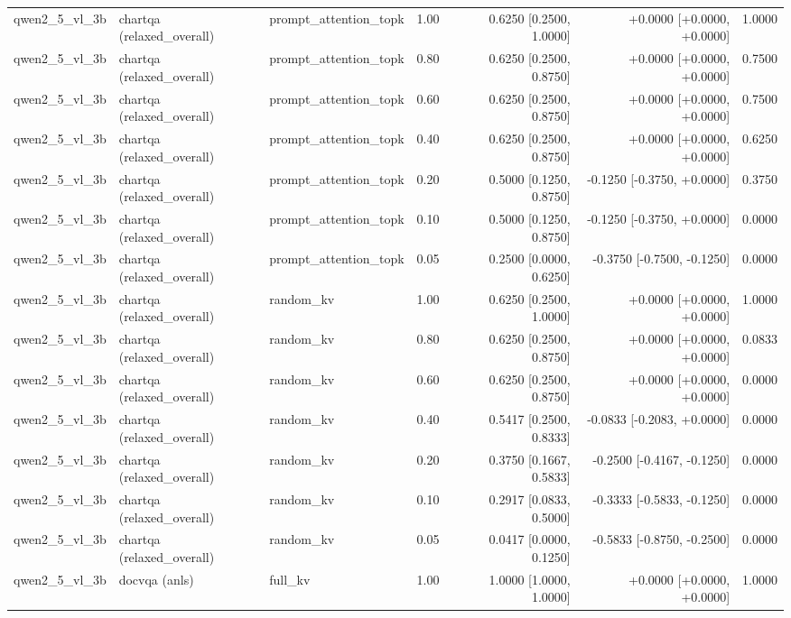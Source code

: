 \begin{longtable}{lllrrrr}
qwen2\_5\_vl\_3b & chartqa (relaxed\_overall) & prompt\_attention\_topk & 1.00 & 0.6250 [0.2500, 1.0000] & +0.0000 [+0.0000, +0.0000] & 1.0000 \\
qwen2\_5\_vl\_3b & chartqa (relaxed\_overall) & prompt\_attention\_topk & 0.80 & 0.6250 [0.2500, 0.8750] & +0.0000 [+0.0000, +0.0000] & 0.7500 \\
qwen2\_5\_vl\_3b & chartqa (relaxed\_overall) & prompt\_attention\_topk & 0.60 & 0.6250 [0.2500, 0.8750] & +0.0000 [+0.0000, +0.0000] & 0.7500 \\
qwen2\_5\_vl\_3b & chartqa (relaxed\_overall) & prompt\_attention\_topk & 0.40 & 0.6250 [0.2500, 0.8750] & +0.0000 [+0.0000, +0.0000] & 0.6250 \\
qwen2\_5\_vl\_3b & chartqa (relaxed\_overall) & prompt\_attention\_topk & 0.20 & 0.5000 [0.1250, 0.8750] & -0.1250 [-0.3750, +0.0000] & 0.3750 \\
qwen2\_5\_vl\_3b & chartqa (relaxed\_overall) & prompt\_attention\_topk & 0.10 & 0.5000 [0.1250, 0.8750] & -0.1250 [-0.3750, +0.0000] & 0.0000 \\
qwen2\_5\_vl\_3b & chartqa (relaxed\_overall) & prompt\_attention\_topk & 0.05 & 0.2500 [0.0000, 0.6250] & -0.3750 [-0.7500, -0.1250] & 0.0000 \\
qwen2\_5\_vl\_3b & chartqa (relaxed\_overall) & random\_kv & 1.00 & 0.6250 [0.2500, 1.0000] & +0.0000 [+0.0000, +0.0000] & 1.0000 \\
qwen2\_5\_vl\_3b & chartqa (relaxed\_overall) & random\_kv & 0.80 & 0.6250 [0.2500, 0.8750] & +0.0000 [+0.0000, +0.0000] & 0.0833 \\
qwen2\_5\_vl\_3b & chartqa (relaxed\_overall) & random\_kv & 0.60 & 0.6250 [0.2500, 0.8750] & +0.0000 [+0.0000, +0.0000] & 0.0000 \\
qwen2\_5\_vl\_3b & chartqa (relaxed\_overall) & random\_kv & 0.40 & 0.5417 [0.2500, 0.8333] & -0.0833 [-0.2083, +0.0000] & 0.0000 \\
qwen2\_5\_vl\_3b & chartqa (relaxed\_overall) & random\_kv & 0.20 & 0.3750 [0.1667, 0.5833] & -0.2500 [-0.4167, -0.1250] & 0.0000 \\
qwen2\_5\_vl\_3b & chartqa (relaxed\_overall) & random\_kv & 0.10 & 0.2917 [0.0833, 0.5000] & -0.3333 [-0.5833, -0.1250] & 0.0000 \\
qwen2\_5\_vl\_3b & chartqa (relaxed\_overall) & random\_kv & 0.05 & 0.0417 [0.0000, 0.1250] & -0.5833 [-0.8750, -0.2500] & 0.0000 \\
qwen2\_5\_vl\_3b & docvqa (anls) & full\_kv & 1.00 & 1.0000 [1.0000, 1.0000] & +0.0000 [+0.0000, +0.0000] & 1.0000 \\

\end{longtable}
